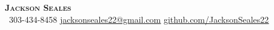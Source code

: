 \begin{center}
    \textbf{\Huge \scshape Jackson Seales} \\ \vspace{1pt}
     \ \small 303-434-8458 \quad
    \href{mailto:firstlast@gmail.com}{ \underline{jacksonseales22@gmail.com}} \quad
    \href{https://github.com/}{ \underline{github.com/JacksonSeales22}}
\end{center}

